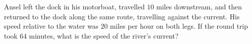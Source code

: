 Ansel left the dock in his motorboat, travelled $10$ miles downstream, and then returned to the dock along the same route, travelling against the current. His speed relative to the water was $20$ miles per hour on both legs. If the round trip took $64$ minutes, what is the speed of the river's current?
